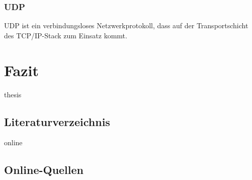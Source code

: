 \documentclass[11pt,a4paper]{report}
\begin{document}
\subsection*{UDP}
UDP ist ein verbindungsloses Netzwerkprotokoll, dass auf der Transportschicht des TCP/IP-Stack zum Einsatz kommt.



\chapter*{Fazit}



\begin{btSect}{thesis} %
\section*{Literaturverzeichnis}
\btPrintCited
\end{btSect}
\begin{btSect}{online}
\section*{Online-Quellen}
\btPrintCited
\end{btSect}
\end{document}
